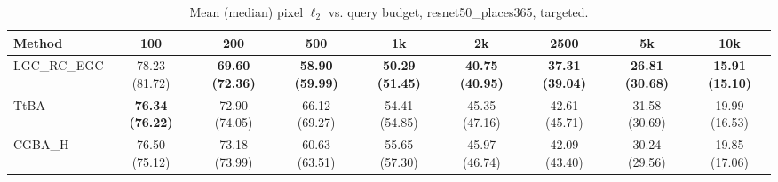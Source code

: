 \begin{table}[t]
\centering\footnotesize
\caption{Mean (median) pixel $\ell_2$ vs. query budget, resnet50\_places365, targeted.}
\begin{tabular}{lcccccccc}
\toprule
Method & 100 & 200 & 500 & 1k & 2k & 2500 & 5k & 10k \\
\midrule
LGC\_RC\_EGC & 78.23 (81.72) & \textbf{69.60 (72.36)} & \textbf{58.90 (59.99)} & \textbf{50.29 (51.45)} & \textbf{40.75 (40.95)} & \textbf{37.31 (39.04)} & \textbf{26.81 (30.68)} & \textbf{15.91 (15.10)} \\
TtBA & \textbf{76.34 (76.22)} & 72.90 (74.05) & 66.12 (69.27) & 54.41 (54.85) & 45.35 (47.16) & 42.61 (45.71) & 31.58 (30.69) & 19.99 (16.53) \\
CGBA\_H & 76.50 (75.12) & 73.18 (73.99) & 60.63 (63.51) & 55.65 (57.30) & 45.97 (46.74) & 42.09 (43.40) & 30.24 (29.56) & 19.85 (17.06) \\
\bottomrule
\end{tabular}
\end{table}
